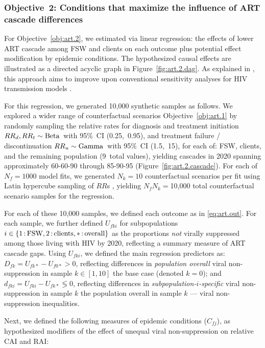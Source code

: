 \subsubsection{Objective~2: Conditions that maximize the influence of ART cascade differences}\label{art.meth.obj.2}
For Objective~\ref{obj:art.2}, we estimated via linear regression:
the effects of lower ART cascade among FSW and clients on each outcome
plus potential effect modification by epidemic conditions.
The hypothesized causal effects are illustrated
as a directed acyclic graph in Figure~\ref{fig:art.2.dag}.
As explained in , this approach aims to improve upon
conventional sensitivity analyses for HIV transmission models \cite{Blower1994}.
\par
For this regression, we generated 10,000 synthetic samples as follows.
We explored a wider range of counterfactual scenarios \vs Objective~\ref{obj:art.1}
by randomly sampling the relative rates for
diagnosis and treatment initiation ${RR}_d, {RR}_t \sim \textnormal{Beta}\,$ with 95\%~CI (0.25,~0.95),
and treatment failure / discontinuation ${RR}_u \sim \textnormal{Gamma}\,$ with 95\%~CI (1.5,~15),
for each of: FSW, clients, and the remaining population (9~total values),
yielding cascades in 2020 spanning
approximately \mbox{60-60-90} through \mbox{85-90-95} (Figure~\ref{fig:art.2.cascade}). %
For each of $N_f = 1000$ model fits,
we generated $N_k = 10$ counterfactual scenarios per fit
using Latin hypercube sampling of $RR$s \cite{Stein1987},
yielding $N_f N_k = {}$10,000 total counterfactual scenario samples for the regression.
\par
For each of these 10,000 samples, we defined each outcome as in \eqref{eq:art.out}.
For each sample, we further defined
$U_{fki}$ for subpopulations $i \in \{1{\,:\,}\textnormal{FSW}, 2{\,:\,}\textnormal{clients}, *{\,:\,}\textnormal{overall}\}$
as the proportions \emph{not} virally suppressed among those living with HIV by 2020,
reflecting a summary measure of ART cascade gaps.
Using $U_{fki}$, we defined the main regression predictors as:
$D_{fk} = U_{fk*} - U_{f0*} > 0$, reflecting differences in
\emph{population overall} viral non-suppression in sample $k \in [1,10]$
\vs the base case (denoted $k = 0$); and
$d_{fki} = U_{fki} - U_{fk*} \lessgtr 0$, reflecting differences in
\emph{subpopulation-$i$-specific} viral non-suppression in sample $k$
\vs the population overall in sample $k$ --- \ie viral non-suppression inequalities.
\par
Next, we defined the following measures of epidemic conditions ($C_{fj}$),
as hypothesized modifiers of the effect of unequal viral non-suppression on relative CAI and RAI:
